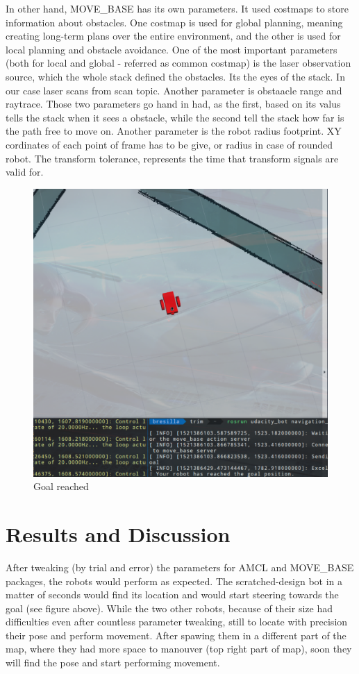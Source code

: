 \documentclass[10pt,journal,compsoc]{IEEEtran}
\begin{document}
    In other hand, MOVE\_BASE has its own parameters. It used costmaps to store information about obstacles. One costmap is used for global planning, meaning creating long-term plans over the entire environment, and the other is used for local planning and obstacle avoidance. One of the most important parameters (both for local and global - referred as common costmap) is the laser observation source, which the whole stack defined the obstacles. Its the eyes of the stack. In our case laser scans from scan topic. Another parameter is obstaacle range and raytrace. Those two parameters go hand in had, as the first, based on its valus tells the stack when it sees a obstacle, while the second tell the stack how far is the path free to move on. Another parameter is the robot radius footprint. XY cordinates of each point of frame has to be give, or radius in case of rounded robot. The transform tolerance, represents the time that transform signals are valid for.

    \begin{figure}[thptb]
        \centering
        \includegraphics[width=\linewidth]{goal_reched.png}
        \caption{Goal reached}
        \label{fig:robot3}
    \end{figure}
   
     
    \section{Results and Discussion}
    After tweaking (by trial and error) the parameters for AMCL and MOVE\_BASE packages, the robots would perform as expected. The scratched-design bot in a matter of seconds would find its location and would start steering towards the goal (see figure above). While the two other robots, because of their size had difficulties even after countless parameter tweaking, still to locate with precision their pose and perform movement. After spawing them in a different part of the map, where they had more space to manouver (top right part of map), soon they will find the pose and start performing movement.
\end{document}
